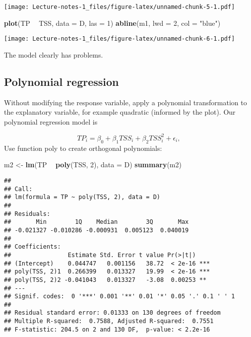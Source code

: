 \documentclass[
]{book}
\newenvironment{Shaded}{\begin{snugshade}}{\end{snugshade}}
\newcommand{\DataTypeTok}[1]{\textcolor[rgb]{0.13,0.29,0.53}{#1}}
\newcommand{\DecValTok}[1]{\textcolor[rgb]{0.00,0.00,0.81}{#1}}
\newcommand{\KeywordTok}[1]{\textcolor[rgb]{0.13,0.29,0.53}{\textbf{#1}}}
\newcommand{\NormalTok}[1]{#1}
\newcommand{\OperatorTok}[1]{\textcolor[rgb]{0.81,0.36,0.00}{\textbf{#1}}}
\newcommand{\StringTok}[1]{\textcolor[rgb]{0.31,0.60,0.02}{#1}}
\begin{document}
\texttt{[image: Lecture-notes-1\_files/figure-latex/unnamed-chunk-5-1.pdf]}

\begin{Shaded}
\begin{Highlighting}[]
\KeywordTok{plot}\NormalTok{(TP }\OperatorTok{~}\StringTok{ }\NormalTok{TSS, }\DataTypeTok{data =}\NormalTok{ D, }\DataTypeTok{las =} \DecValTok{1}\NormalTok{)}
\KeywordTok{abline}\NormalTok{(m1, }\DataTypeTok{lwd =} \DecValTok{2}\NormalTok{, }\DataTypeTok{col =} \StringTok{"blue"}\NormalTok{)}
\end{Highlighting}
\end{Shaded}

\texttt{[image: Lecture-notes-1\_files/figure-latex/unnamed-chunk-6-1.pdf]}

The model clearly has problems.

\hypertarget{polynomial-regression}{%
\subsection{Polynomial regression}\label{polynomial-regression}}

Without modifying the response variable, apply a polynomial transformation to the explanatory variable, for example quadratic (informed by the plot). Our polynomial regression model is

\[TP_i = \beta_0 + \beta_1 TSS_i + \beta_2 TSS^2_i + \epsilon_i,\]
Use function poly to create orthogonal polynomials:

\begin{Shaded}
\begin{Highlighting}[]
\NormalTok{m2 <-}\StringTok{ }\KeywordTok{lm}\NormalTok{(TP }\OperatorTok{~}\StringTok{ }\KeywordTok{poly}\NormalTok{(TSS, }\DecValTok{2}\NormalTok{), }\DataTypeTok{data =}\NormalTok{ D)}
\KeywordTok{summary}\NormalTok{(m2)}
\end{Highlighting}
\end{Shaded}

\begin{verbatim}
## 
## Call:
## lm(formula = TP ~ poly(TSS, 2), data = D)
## 
## Residuals:
##       Min        1Q    Median        3Q       Max 
## -0.021327 -0.010286 -0.000931  0.005123  0.040019 
## 
## Coefficients:
##                Estimate Std. Error t value Pr(>|t|)    
## (Intercept)    0.044747   0.001156   38.72  < 2e-16 ***
## poly(TSS, 2)1  0.266399   0.013327   19.99  < 2e-16 ***
## poly(TSS, 2)2 -0.041043   0.013327   -3.08  0.00253 ** 
## ---
## Signif. codes:  0 '***' 0.001 '**' 0.01 '*' 0.05 '.' 0.1 ' ' 1
## 
## Residual standard error: 0.01333 on 130 degrees of freedom
## Multiple R-squared:  0.7588, Adjusted R-squared:  0.7551 
## F-statistic: 204.5 on 2 and 130 DF,  p-value: < 2.2e-16
\end{verbatim}
\end{document}
